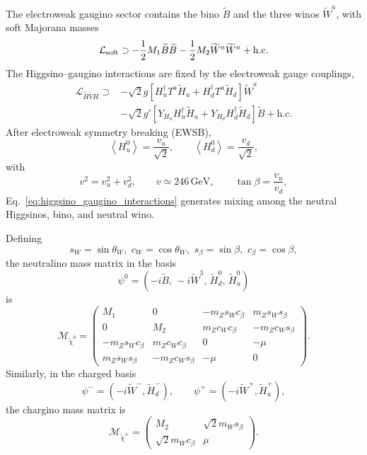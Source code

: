 \documentclass[aps,prd,reprint,superscriptaddress,nofootinbib,longbibliography,floatfix]{revtex4-2}
\newcommand{\GeV}{\mathrm{GeV}}
\begin{document}
The electroweak gaugino sector contains the bino $\widetilde B$ and the three winos $\widetilde W^a$, with soft Majorana masses
\begin{equation}
\mathcal{L}_{\rm soft}
\supset
-\frac{1}{2}M_1\widetilde B\widetilde B
-\frac{1}{2}M_2\widetilde W^a\widetilde W^a
+\mathrm{h.c.}
\label{eq:gaugino_masses}
\end{equation}
The Higgsino--gaugino interactions are fixed by the electroweak gauge couplings,
\begin{align}
\mathcal{L}_{\widetilde H\widetilde V H}
\supset{}&
-\sqrt{2}g
\left[
H_u^\dagger T^a\widetilde H_u
+
H_d^\dagger T^a\widetilde H_d
\right]
\widetilde W^a
\nonumber\\
&
-\sqrt{2}g'
\left[
Y_{H_u}H_u^\dagger\widetilde H_u
+
Y_{H_d}H_d^\dagger\widetilde H_d
\right]
\widetilde B
+\mathrm{h.c.}
\label{eq:higgsino_gaugino_interactions}
\end{align}
After electroweak symmetry breaking (EWSB),
\begin{equation}
\left\langle H_u^0\right\rangle
=
\frac{v_u}{\sqrt{2}},
\qquad
\left\langle H_d^0\right\rangle
=
\frac{v_d}{\sqrt{2}},
\end{equation}
with
\begin{equation}
v^2=v_u^2+v_d^2,
\qquad
v\simeq246\,\GeV,
\qquad
\tan\beta=\frac{v_u}{v_d},
\end{equation}
Eq.~\eqref{eq:higgsino_gaugino_interactions} generates mixing among the neutral Higgsinos, bino, and neutral wino.

Defining
\begin{equation}
s_W=\sin\theta_W,
\,\,
c_W=\cos\theta_W,
\,\,
s_\beta=\sin\beta,
\,\,
c_\beta=\cos\beta,
\end{equation}
the neutralino mass matrix in the basis
\begin{equation}
\psi^0=
\left(
-i\widetilde B,\,
-i\widetilde W^3,\,
\widetilde H_d^0,\,
\widetilde H_u^0
\right)
\end{equation}
is
\begin{equation}
\mathcal{M}_{\widetilde\chi^0}
=\!\!
\begin{pmatrix}
M_1
&
0
&
-m_Zs_Wc_\beta
&
m_Zs_Ws_\beta
\\
0
&
M_2
&
m_Zc_Wc_\beta
&
-m_Zc_Ws_\beta
\\
-m_Zs_Wc_\beta
&
m_Zc_Wc_\beta
&
0
&
-\mu
\\
m_Zs_Ws_\beta
&
-m_Zc_Ws_\beta
&
-\mu
&
0
\end{pmatrix}.
\label{eq:neutralino_mass_matrix}
\end{equation}
Similarly, in the charged basis
\begin{equation}
\psi^-=
\left(
-i\widetilde W^-,
\widetilde H_d^-
\right),
\qquad
\psi^+=
\left(
-i\widetilde W^+,
\widetilde H_u^+
\right),
\end{equation}
the chargino mass matrix is
\begin{equation}
\mathcal{M}_{\widetilde\chi^\pm}
=
\begin{pmatrix}
M_2
&
\sqrt{2}m_Ws_\beta
\\
\sqrt{2}m_Wc_\beta
&
\mu
\end{pmatrix}.
\label{eq:chargino_mass_matrix}
\end{equation}
\end{document}
